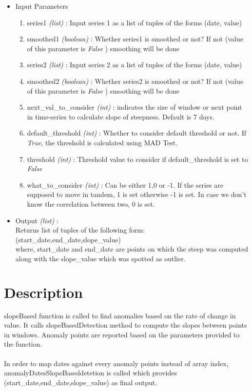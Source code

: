 \begin{itemize}
 \item Input Parameters
 
 \begin{enumerate}
  \item series1 \textit{(list)} : Input series 1 as a list of tuples of the forms (date, value)
  \item smoothed1 \textit{(boolean)} : Whether series1 is smoothed or not? If not (value of this parameter is \textit{False} ) smoothing will be done
  \item series2 \textit{(list)} : Input series 2 as a list of tuples of the forms (date, value)
  \item smoothed2 \textit{(boolean)} : Whether series2 is smoothed or not? If not (value of this parameter is \textit{False} ) smoothing will be done
  \item next{\_}val{\_}to{\_}consider \textit{(int)} : indicates the size of window or next point in time-series to calculate slope of steepness. Default is 7 days.
  \item default{\_}threshold \textit{(int)} : Whether to consider default threshold or not. If \textit{True}, the threshold is calculated using MAD Test.
  \item threshold \textit{(int)} : Threshold value to consider if default\_threshold is set to \textit{False}
  \item what{\_}to{\_}consider \textit{(int)} : Can be either 1,0 or -1. If the series are supposed to move in tandem, 1 is set otherwise -1 is set. In case we don't know the correlation between two, 0 is set.
  \end{enumerate}

 \item Output \textit{(list)} : \\
 	Returns list of tuples of the following form: \\ 
 	(start\_date,end\_date,slope\_value)\\
 	where, start\_date and end\_date are points on which the steep was computed along with the slope\_value which was spotted as outlier.
 
\end{itemize}

\section{Description}

slopeBased function is called to find anomalies based on the rate of change in value. It calls slopeBasedDetection method to compute the slopes between points in windows. 
Anomaly points are reported based on the parameters provided to the function. \\
\\
In order to map dates against every anomaly points instead of array index, anomalyDatesSlopeBaseddetetion is called which provides (start\_date,end\_date,slope\_value) as final output.